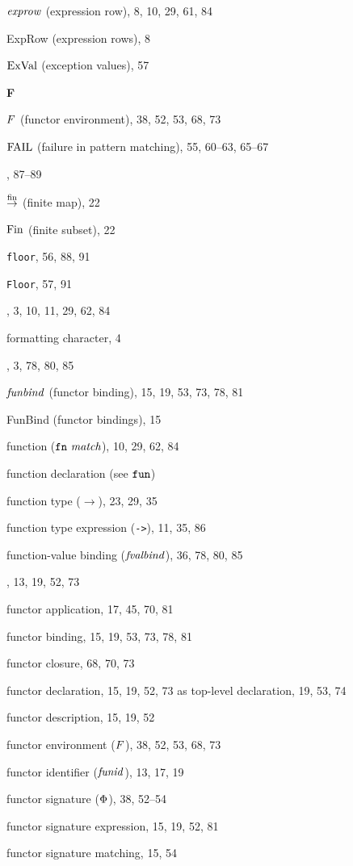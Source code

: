 \begin{theindex}
\item ${\it exprow}$ (expression row), 8, 10, 29, 61, 84
\item ExpRow (expression rows), 8
\item ${\rm ExVal}$ (exception values), 57
\indexspace
\parbox{65mm}{\hfil{\large\bf F}\hfil}
\indexspace
\item $F$ (functor environment), 38, 52, 53, 68, 73
\item ${\rm FAIL}$ (failure in pattern matching), 55, 60--63, 65--67
\item \FALSE, 87--89
\item $\stackrel{{\rm fin}}{\to}$ (finite map), 22
\item $\mathop{\rm Fin}\nolimits$ (finite subset), 22
\item {\tt floor}, 56, 88, 91
\item {\tt Floor}, 57, 91
\item \FN, 3, 10, 11, 29, 62, 84
\item formatting character, 4
\item \FUN, 3, 78, 80, 85
\item ${\it funbind}$ (functor binding), 15, 19, 53, 73, 78, 81
\item FunBind (functor bindings), 15
\item function ($\mbox{{\tt fn}\ {\it match}}$), 10, 29, 62, 84
\item function declaration (see ${\tt fun}$) 
\item function type ($\rightarrow$), 23, 29, 35
\item function type expression (\verb+->+), 11, 35, 86
\item function-value binding (${\it fvalbind}$), 36, 78, 80, 85
\item \FUNCTOR, 13, 19, 52, 73
\item functor application, 17, 45, 70, 81
\item functor binding, 15, 19, 53, 73, 78, 81
\item functor closure, 68, 70, 73
\item functor declaration, 15, 19, 52, 73
\subitem as top-level declaration, 19, 53, 74
\item functor description, 15, 19, 52
\item functor environment ($F$), 38, 52, 53, 68, 73
\item functor identifier (${\it funid}$), 13, 17, 19
\item functor signature ($\Phi$), 38, 52--54
\item functor signature expression, 15, 19, 52, 81
\item functor signature matching, 15, 54

\end{theindex}
